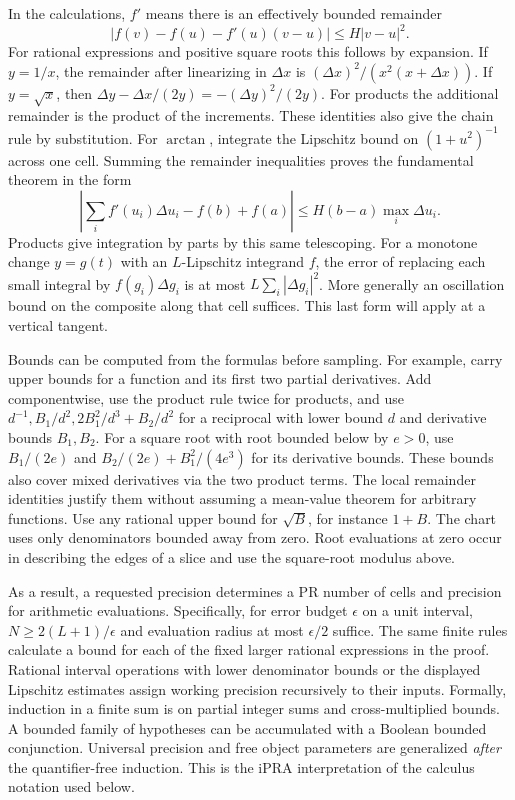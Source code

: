 \documentclass[11pt,letterpaper]{article}
\newcommand{\subt}[1]{\par\medskip\noindent{\color{sea}\bfseries #1}\enspace}
\begin{document}
\newpage
\subt{Derivatives as finite remainders.}
In the calculations, \(f'\) means there is an effectively bounded remainder
\[
 |f(v)-f(u)-f'(u)(v-u)|\le H|v-u|^2 .
\]
For rational expressions and positive square roots this follows by expansion. If \(y=1/x\), the remainder after linearizing in \(\Delta x\) is \((\Delta x)^2/(x^2(x+\Delta x))\). If \(y=\sqrt x\), then
\(\Delta y-\Delta x/(2y)=-(\Delta y)^2/(2y)\). For products the additional remainder is the product of the increments. These identities also give the chain rule by substitution. For \(\arctan\), integrate the Lipschitz bound on \((1+u^2)^{-1}\) across one cell. Summing the remainder inequalities proves the fundamental theorem in the form
\[
 \left|\sum_i f'(u_i)\Delta u_i-f(b)+f(a)\right|
      \le H(b-a)\max_i\Delta u_i .
\]
Products give integration by parts by this same telescoping. For a monotone change \(y=g(t)\) with an \(L\)-Lipschitz integrand \(f\), the error of replacing each small integral by \(f(g_i)\Delta g_i\) is at most \(L\sum_i|\Delta g_i|^2\). More generally an oscillation bound on the composite along that cell suffices. This last form will apply at a vertical tangent.

Bounds can be computed from the formulas before sampling. For example, carry upper bounds for a function and its first two partial derivatives. Add componentwise, use the product rule twice for products, and use \(d^{-1}, B_1/d^2,2B_1^2/d^3+B_2/d^2\) for a reciprocal with lower bound \(d\) and derivative bounds \(B_1,B_2\). For a square root with root bounded below by \(e>0\), use \(B_1/(2e)\) and \(B_2/(2e)+B_1^2/(4e^3)\) for its derivative bounds. These bounds also cover mixed derivatives via the two product terms. The local remainder identities justify them without assuming a mean-value theorem for arbitrary functions. Use any rational upper bound for \(\sqrt B\), for instance \(1+B\). The chart uses only denominators bounded away from zero. Root evaluations at zero occur in describing the edges of a slice and use the square-root modulus above.

As a result, a requested precision determines a PR number of cells and precision for arithmetic evaluations. Specifically, for error budget \(\epsilon\) on a unit interval, \(N\ge 2(L+1)/\epsilon\) and evaluation radius at most \(\epsilon/2\) suffice. The same finite rules calculate a bound for each of the fixed larger rational expressions in the proof. Rational interval operations with lower denominator bounds or the displayed Lipschitz estimates assign working precision recursively to their inputs. Formally, induction in a finite sum is on partial integer sums and cross-multiplied bounds. A bounded family of hypotheses can be accumulated with a Boolean bounded conjunction. Universal precision and free object parameters are generalized \emph{after} the quantifier-free induction. This is the iPRA interpretation of the calculus notation used below.
\end{document}
